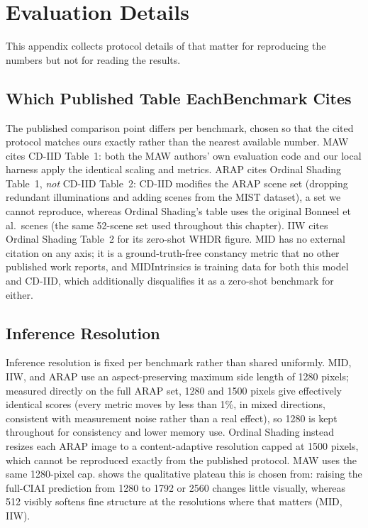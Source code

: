 \chapter{Evaluation Details}
\label{app:eval}

This appendix collects protocol details of  that matter for
reproducing the numbers but not for reading the results.

\section[Which Published Table Each Benchmark Cites]{Which Published Table Each\newline Benchmark Cites}
The published comparison point differs per benchmark, chosen so that the cited
protocol matches ours exactly rather than the nearest available number.
MAW cites CD-IID Table~1: both the MAW authors' own evaluation code and our
local harness apply the identical scaling and metrics.
ARAP cites Ordinal Shading Table~1, \emph{not} CD-IID Table~2: CD-IID modifies
the ARAP scene set (dropping redundant illuminations and adding scenes from the
MIST dataset), a set we cannot reproduce, whereas Ordinal Shading's table uses
the original Bonneel et al.\ scenes (the same 52-scene set used throughout
this chapter). IIW cites Ordinal Shading Table~2 for its zero-shot WHDR figure.
MID has no external citation on any axis; it is a ground-truth-free constancy
metric that no other published work reports, and MIDIntrinsics is training data
for both this model and CD-IID, which additionally disqualifies it as a
zero-shot benchmark for either.

\section{Inference Resolution}
Inference resolution is fixed per benchmark rather than shared uniformly.
MID, IIW, and ARAP use an aspect-preserving maximum side length of 1280 pixels;
measured directly on the full ARAP set, 1280 and 1500 pixels give effectively
identical scores (every metric moves by less than 1\%, in mixed directions,
consistent with measurement noise rather than a real effect), so 1280 is kept
throughout for consistency and lower memory use.
Ordinal Shading  instead resizes each ARAP image to a
content-adaptive resolution capped at 1500 pixels, which cannot be reproduced exactly from
the published protocol. MAW uses the same 1280-pixel cap.
 shows the qualitative plateau this is chosen from:
raising the full-CIAI prediction from 1280 to 1792 or 2560 changes little
visually, whereas 512 visibly softens fine structure at the resolutions where
that matters (MID, IIW).


